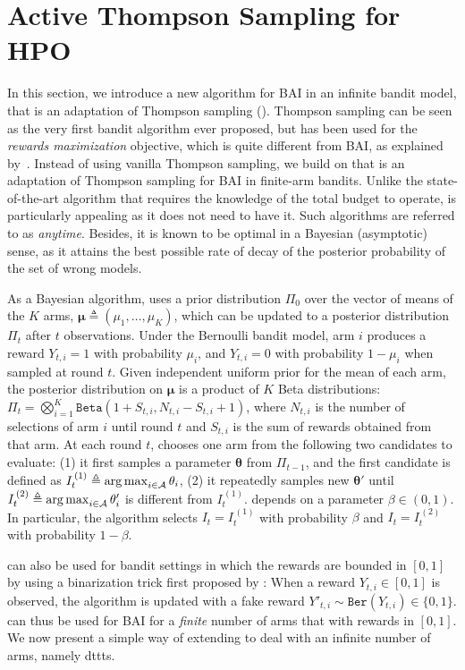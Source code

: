 \section{Active Thompson Sampling for HPO}\label{sec:dttts.algorithm}

In this section, we introduce a new algorithm for BAI in an infinite bandit model, that is an adaptation of Thompson sampling (\citealp{thompson1933}). Thompson sampling can be seen as the very first bandit algorithm ever proposed, but has been used for the \emph{rewards maximization} objective, which is quite different from BAI, as explained by~\cite{bubeck2009pure}. Instead of using vanilla Thompson sampling, we build on \TTTS that is an adaptation of Thompson sampling for BAI in finite-arm bandits. Unlike the state-of-the-art algorithm \SHA that requires the knowledge of the total budget to operate, \TTTS is particularly appealing as it does not need to have it. Such algorithms are referred to as \emph{anytime}. Besides, it is known to be optimal in a Bayesian (asymptotic) sense, as it attains the best possible rate of decay of the posterior probability of the set of wrong models. 

As a Bayesian algorithm, \TTTS uses a prior distribution $\Pi_0$ over the vector of means of the $K$ arms, $\bm\mu \triangleq (\mu_1,\dots,\mu_K)$, which can be updated to a posterior distribution $\Pi_t$ after $t$ observations. Under the Bernoulli bandit model, arm $i$ produces a reward $Y_{t,i}=1$ with probability $\mu_i$, and $Y_{t,i}=0$ with probability $1-\mu_i$ when sampled at round $t$. Given independent uniform prior for the mean of each arm, the posterior distribution on $\bm\mu$ is a product of $K$ Beta distributions: $\Pi_t = \bigotimes_{i=1}^{K} \texttt{Beta}(1+S_{t,i},N_{t,i}-S_{t,i}+1)$, where $N_{t,i}$ is the number of selections of arm $i$ until round $t$ and $S_{t,i}$ is the sum of rewards obtained from that arm. At each round $t$, \TTTS chooses one arm from the following two candidates to evaluate: (1) it first samples a parameter ${\bm\theta}$ from $\Pi_{t-1}$, and the first candidate is defined as $I_t^{\,(1)} \triangleq \operatorname*{arg\,max}_{i\in\mathcal{A}} {\theta}_i$, (2) it repeatedly samples new ${\bm\theta}'$ until $I_t^{\,(2)} \triangleq \operatorname*{arg\,max}_{i\in\mathcal{A}} \theta_i'$ is different from $I_t^{\,(1)}$. \TTTS depends on a parameter $\beta \in (0,1)$. In particular, the algorithm selects $I_t = I_t^{\,(1)}$ with probability $\beta$ and $I_t = I_t^{\,(2)}$ with probability $1-\beta$.

\TTTS can also be used for bandit settings in which the rewards are bounded in $[0,1]$ by using a binarization trick first proposed by \cite{agrawal2012analysis}: When a reward $Y_{t,i} \in [0,1]$ is observed, the algorithm is updated with a fake reward  $Y'_{t,i} \sim \texttt{Ber}(Y_{t,i}) \in \{0,1\}$. \TTTS can thus be used for BAI for a \emph{finite} number of arms that with rewards in $[0,1]$. We now present a simple way of extending \TTTS{} to deal with an infinite number of arms, namely \gls{dttts}.

